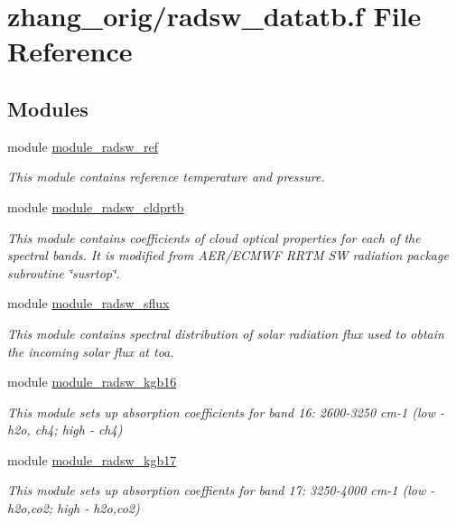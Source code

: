\hypertarget{zhang__orig_2radsw__datatb_8f}{}\section{zhang\+\_\+orig/radsw\+\_\+datatb.f File Reference}
\label{zhang__orig_2radsw__datatb_8f}
\subsection*{Modules}
\begin{DoxyCompactItemize}
\item 
module \hyperlink{namespacemodule__radsw__ref}{module\+\_\+radsw\+\_\+ref}
\begin{DoxyCompactList}\small\item\em This module contains reference temperature and pressure. \end{DoxyCompactList}\item 
module \hyperlink{namespacemodule__radsw__cldprtb}{module\+\_\+radsw\+\_\+cldprtb}
\begin{DoxyCompactList}\small\item\em This module contains coefficients of cloud optical properties for each of the spectral bands. It is modified from A\+E\+R/\+E\+C\+M\+WF R\+R\+TM SW radiation package subroutine \char`\"{}susrtop\char`\"{}. \end{DoxyCompactList}\item 
module \hyperlink{namespacemodule__radsw__sflux}{module\+\_\+radsw\+\_\+sflux}
\begin{DoxyCompactList}\small\item\em This module contains spectral distribution of solar radiation flux used to obtain the incoming solar flux at toa. \end{DoxyCompactList}\item 
module \hyperlink{namespacemodule__radsw__kgb16}{module\+\_\+radsw\+\_\+kgb16}
\begin{DoxyCompactList}\small\item\em This module sets up absorption coefficients for band 16\+: 2600-\/3250 cm-\/1 (low -\/ h2o, ch4; high -\/ ch4) \end{DoxyCompactList}\item 
module \hyperlink{namespacemodule__radsw__kgb17}{module\+\_\+radsw\+\_\+kgb17}
\begin{DoxyCompactList}\small\item\em This module sets up absorption coeffients for band 17\+: 3250-\/4000 cm-\/1 (low -\/ h2o,co2; high -\/ h2o,co2) \end{DoxyCompactList}\item 

\end{DoxyCompactItemize}
